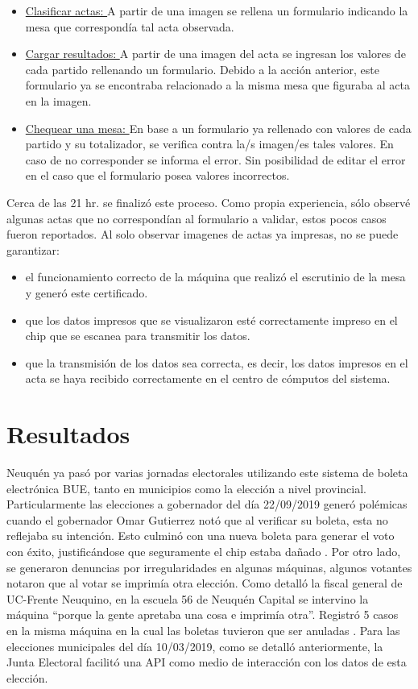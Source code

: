 \begin{itemize}
    \item \underline{Clasificar actas: }A partir de una imagen se rellena un formulario indicando la mesa que correspondía tal acta observada.
    \item \underline{Cargar resultados: }A partir de una imagen del acta se ingresan los valores de cada partido rellenando un formulario. Debido a la acción anterior, este formulario ya se encontraba relacionado a la misma mesa que figuraba al acta en la imagen.
    \item \underline{Chequear una mesa: }En base a un formulario ya rellenado con valores de cada partido y su totalizador, se verifica contra la/s imagen/es tales valores. En caso de no corresponder se informa el error. Sin posibilidad de editar el error en el caso que el formulario posea valores incorrectos.
\end{itemize}
Cerca de las 21 hr. se finalizó este proceso. Como propia experiencia, sólo observé algunas actas que no correspondían al formulario a validar, estos pocos casos fueron reportados. 
Al solo observar imagenes de actas ya impresas, no se puede garantizar:
\begin{itemize}
    \item el funcionamiento correcto de la máquina que realizó el escrutinio de la mesa y generó este certificado.
    \item que los datos impresos que se visualizaron esté correctamente impreso en el chip que se escanea para transmitir los datos.
    \item que la transmisión de los datos sea correcta, es decir, los datos impresos  en el acta se haya recibido correctamente en el centro de cómputos del sistema.
\end{itemize}

\section{Resultados}
Neuquén ya pasó por varias jornadas electorales utilizando este sistema de boleta electrónica BUE, tanto en municipios como la elección a nivel provincial. Particularmente las elecciones a gobernador del día 22/09/2019 generó polémicas cuando el gobernador Omar Gutierrez notó que al verificar su boleta, esta no reflejaba su intención. Esto culminó con una nueva boleta para generar el voto con éxito, justificándose que seguramente el chip estaba dañado \cite{errorOmarGutierrez}.  Por otro lado, se generaron denuncias por irregularidades en algunas máquinas, algunos votantes notaron que al votar se imprimía otra elección. Como detalló la fiscal general de UC-Frente Neuquino, en la escuela 56 de Neuquén Capital se intervino la máquina ``porque la gente apretaba una cosa e imprimía otra''. Registró 5 casos en la misma máquina en la cual las boletas tuvieron que ser anuladas \cite{errorNeuquen}. \newline
Para las elecciones municipales del día 10/03/2019, como se detalló anteriormente, la Junta Electoral facilitó una API como medio de interacción con los datos de esta elección. 


